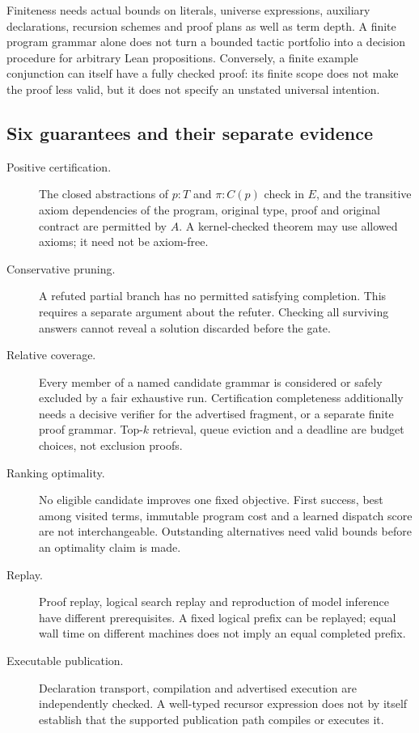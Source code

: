 Finiteness needs actual bounds on literals, universe expressions, auxiliary
declarations, recursion schemes and proof plans as well as term depth. A
finite program grammar alone does not turn a bounded tactic portfolio into a
decision procedure for arbitrary Lean propositions. Conversely, a finite
example conjunction can itself have a fully checked proof: its finite scope
does not make the proof less valid, but it does not specify an unstated
universal intention.

\subsection{Six guarantees and their separate evidence}

\begin{description}
\item[Positive certification.]
The closed abstractions of $p:T$ and $\pi:C(p)$ check in $E$, and the transitive
axiom dependencies of the program, original type, proof and original contract
are permitted by $A$. A kernel-checked theorem may use allowed axioms; it need
not be axiom-free.
\item[Conservative pruning.]
A refuted partial branch has no permitted satisfying completion. This
requires a separate argument about the refuter. Checking all surviving
answers cannot reveal a solution discarded before the gate.
\item[Relative coverage.]
Every member of a named candidate grammar is considered or safely excluded
by a fair exhaustive run. Certification completeness additionally needs a
decisive verifier for the advertised fragment, or a separate finite proof
grammar. Top-$k$ retrieval, queue eviction and a deadline are budget choices,
not exclusion proofs.
\item[Ranking optimality.]
No eligible candidate improves one fixed objective. First success, best among
visited terms, immutable program cost and a learned dispatch score are not
interchangeable. Outstanding alternatives need valid bounds before an
optimality claim is made.
\item[Replay.]
Proof replay, logical search replay and reproduction of model inference have
different prerequisites. A fixed logical prefix can be replayed; equal wall
time on different machines does not imply an equal completed prefix.
\item[Executable publication.]
Declaration transport, compilation and advertised execution are independently
checked. A well-typed recursor expression does not by itself establish that
the supported publication path compiles or executes it.
\end{description}

